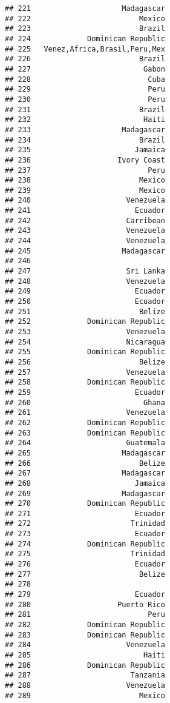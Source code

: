 \documentclass[
]{article}
\begin{document}
\begin{verbatim}
## 221                     Madagascar
## 222                         Mexico
## 223                         Brazil
## 224             Dominican Republic
## 225   Venez,Africa,Brasil,Peru,Mex
## 226                         Brazil
## 227                          Gabon
## 228                           Cuba
## 229                           Peru
## 230                           Peru
## 231                         Brazil
## 232                          Haiti
## 233                     Madagascar
## 234                         Brazil
## 235                        Jamaica
## 236                    Ivory Coast
## 237                           Peru
## 238                         Mexico
## 239                         Mexico
## 240                      Venezuela
## 241                        Ecuador
## 242                      Carribean
## 243                      Venezuela
## 244                      Venezuela
## 245                     Madagascar
## 246                               
## 247                      Sri Lanka
## 248                      Venezuela
## 249                        Ecuador
## 250                        Ecuador
## 251                         Belize
## 252             Dominican Republic
## 253                      Venezuela
## 254                      Nicaragua
## 255             Dominican Republic
## 256                         Belize
## 257                      Venezuela
## 258             Dominican Republic
## 259                        Ecuador
## 260                          Ghana
## 261                      Venezuela
## 262             Dominican Republic
## 263             Dominican Republic
## 264                      Guatemala
## 265                     Madagascar
## 266                         Belize
## 267                     Madagascar
## 268                        Jamaica
## 269                     Madagascar
## 270             Dominican Republic
## 271                        Ecuador
## 272                       Trinidad
## 273                        Ecuador
## 274             Dominican Republic
## 275                       Trinidad
## 276                        Ecuador
## 277                         Belize
## 278                               
## 279                        Ecuador
## 280                    Puerto Rico
## 281                           Peru
## 282             Dominican Republic
## 283             Dominican Republic
## 284                      Venezuela
## 285                          Haiti
## 286             Dominican Republic
## 287                       Tanzania
## 288                      Venezuela
## 289                         Mexico

\end{verbatim}
\end{document}
